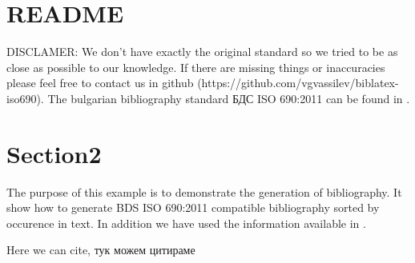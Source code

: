 \documentclass[a4paper,10pt]{ltxdockit}
\begin{document}
  \printtitlepage
  \tableofcontents

  \section{README}
    DISCLAMER: We don't have exactly the original standard so we tried to be as close as possible to our knowledge. If there are missing things or inaccuracies please feel free to contact us in github (https://github.com/vgvassilev/biblatex-iso690). The bulgarian bibliography standard БДС ISO 690:2011 can be found in \cite{bds_iso_690}.

  \section{Section2}
    The purpose of this example is to demonstrate the generation of bibliography. It show how to generate BDS ISO 690:2011 compatible bibliography sorted by occurence in text. In addition we have used the information available in \cite{bglib}.

    Here we can cite, тук можем цитираме \parencite{google}

  \nocite{*} %

  \printbibliography[title={Библиография},heading={bibnumbered}]
\end{document}
